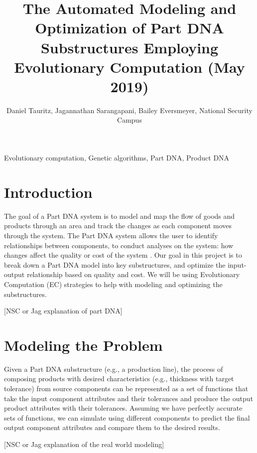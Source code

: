 \documentclass{IEEEtran}
\begin{document}
\title{The Automated Modeling and Optimization of Part DNA Substructures Employing Evolutionary Computation (May 2019)}
\author{Daniel Tauritz, Jagannathan Sarangapani, Bailey Eversmeyer, National Security Campus}

\maketitle

\begin{abstract}

\end{abstract}

\begin{IEEEkeywords}
Evolutionary computation, Genetic algorithms, Part DNA, Product DNA
\end{IEEEkeywords}

\section{Introduction}
The goal of a Part DNA system is to model and map the flow of goods and products through an area and track the changes as each component moves through the system. The Part DNA system allows the user to identify relationships between components, to conduct analyses on the system: how changes affect the quality or cost of the system \cite{b1}. Our goal in this project is to break down a Part DNA model into key substructures, and optimize the input-output relationship based on quality and cost. We will be using Evolutionary Computation (EC) strategies to help with modeling and optimizing the substructures.

[NSC or Jag explanation of part DNA]

\section{Modeling the Problem}
Given a Part DNA substructure (e.g., a production line), the process of composing products with desired characteristics (e.g., thickness with target tolerance) from source components can be represented as a set of functions that take the input component attributes and their tolerances and produce the output product attributes with their tolerances. Assuming we have perfectly accurate sets of functions, we can simulate using different components to predict the final output component attributes and compare them to the desired results.

[NSC or Jag explanation of the real world modeling]
\end{document}
